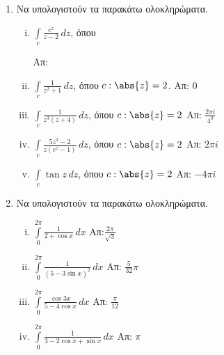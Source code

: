 \begin{enumerate}
\item Να υπολογιστούν τα παρακάτω ολοκληρώματα.

  \begin{enumerate}[i)]
    \item $ \int \limits_c\frac{e^{z}}{z-2} \,{dz} $, \quad όπου 
      \hfill Απ: 
    \item $ \int\limits_c \frac{1}{z^{2}+1} \,{dz} $, όπου $ c:\abs{z} = 2 $.
      \hfill Απ: 0 
    \item $ \int \limits_{c}\frac{1}{z^{3}(z+4)} \,{dz} $, \quad όπου $c:\abs{z}=2 $ 
      \hfill Απ: $ \frac{2 \pi i}{4^{3}} $  
    \item $\int\limits_c\frac{5z^2-2}{z(e^z-1)}\,dz$, \quad όπου $c:\abs{z}=2$ 
      \hfill Απ: $2\pi i$
    \item $\int\limits_c\tan z\,dz$, \quad όπου $c:\abs{z}=2$ \hfill Απ: $-4\pi i$
  \end{enumerate}

\pagebreak

\item Να υπολογιστούν τα παρακάτω ολοκληρώματα.

  \begin{enumerate}[i)]
    \item $\int\limits_0^{2\pi}\frac{1}{2+\cos x}\,dx$ \hfill Απ:$\frac{2
      \pi}{\sqrt{3}}$
    \item $\int\limits_0^{2\pi}\frac{1}{(5-3\sin x)^2}\,dx$ \hfill Απ: $\frac{5}{32}\pi$
    \item $\int\limits_0^{2\pi}\frac{\cos 3x}{5-4\cos x}\,dx$ 
      \hfill Απ: $\frac{\pi}{12}$
    \item $\int\limits_0^{2\pi}\frac{1}{3-2\cos x+\sin x}\,dx$ \hfill Απ: $\pi$
  \end{enumerate}


\end{enumerate}
